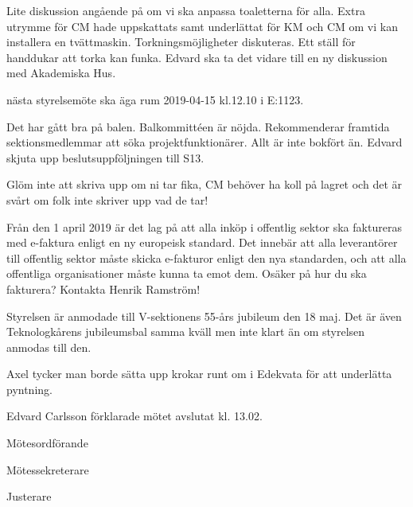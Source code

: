 \documentclass[10pt]{article}
\def\mo{Edvard Carlsson}
\def\ms{Sonja Kenari}
\def\ji{Henrik Ramström}
\begin{document}
\begin{paragrafer}
Lite diskussion angående på om vi ska anpassa toaletterna för alla. Extra utrymme för CM hade uppskattats samt underlättat för KM och CM om vi kan installera en tvättmaskin. Torkningsmöjligheter diskuteras. Ett ställ för handdukar att torka kan funka. Edvard ska ta det vidare till en ny diskussion med Akademiska Hus.

\Mba nästa styrelsemöte ska äga rum 2019-04-15 kl.12.10 i E:1123.

Det har gått bra på balen. Balkommittéen är nöjda. Rekommenderar framtida sektionsmedlemmar att söka projektfunktionärer. Allt är inte bokfört än.
Edvard \ypa skjuta upp beslutsuppföljningen till S13.
\Mbaby

Glöm inte att skriva upp om ni tar fika, CM behöver ha koll på lagret och det är svårt om folk inte skriver upp vad de tar! 

Från den 1 april 2019 är det lag på att alla inköp i offentlig sektor ska faktureras med e-faktura
    enligt en ny europeisk standard. Det innebär att alla leverantörer till offentlig sektor måste skicka e-fakturor enligt 
    den nya standarden, och att alla offentliga organisationer måste kunna ta emot dem. Osäker på hur du ska fakturera? Kontakta Henrik Ramström! 

Styrelsen är anmodade till V-sektionens 55-års jubileum den 18 maj. Det är även Teknologkårens jubileumsbal samma kväll men inte klart än om styrelsen anmodas till den. 

Axel tycker man borde sätta upp krokar runt om i Edekvata för att underlätta pyntning. 

{\mo} förklarade mötet avslutat kl. 13.02.
\end{paragrafer}

\hidesignfoot
\begin{signatures}{3}
\signature{\mo}{Mötesordförande}
\signature{\ms}{Mötessekreterare}
\signature{\ji}{Justerare}
\end{signatures}
\end{document}
